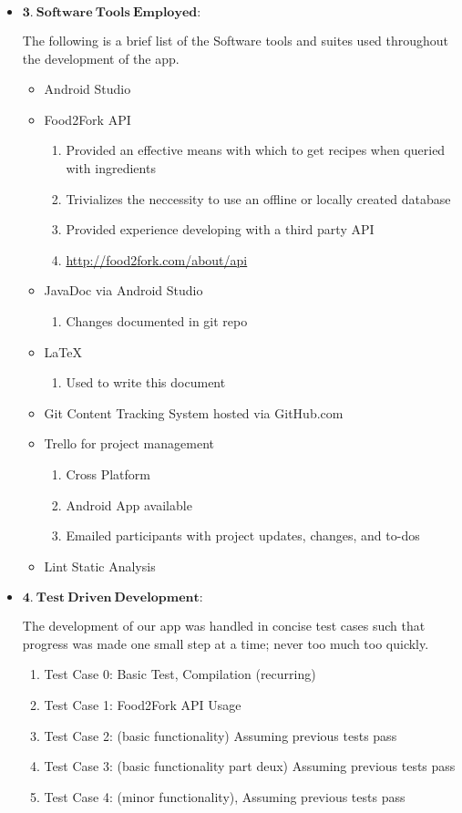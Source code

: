 \documentclass[a4paper,11pt]{article}
\begin{document}
\begin{itemize}
\newpage
\item $\mathbf{3.\ Software\ Tools\ Employed:}$

\parindent 30pt
The following is a brief list of the Software tools and suites used throughout the development of the app.
\begin{itemize}
\item Android Studio
\item Food2Fork API
	\begin{enumerate}
	\item Provided an effective means with which to get recipes when queried with ingredients
	\item Trivializes the neccessity to use an offline or locally created database
	\item Provided experience developing with a third party API
	\item \url{http://food2fork.com/about/api}
	\end{enumerate}
\item JavaDoc via Android Studio
	\begin{enumerate}
	\item Changes documented in git repo
	\end{enumerate}
\item LaTeX
	\begin{enumerate}
	\item Used to write this document
	\end{enumerate}
\item Git Content Tracking System hosted via GitHub.com
\item Trello for project management
	\begin{enumerate}
	\item Cross Platform
	\item Android App available
	\item Emailed participants with project updates, changes, and to-dos
	\end{enumerate}
\item Lint Static Analysis
\end{itemize}

\item $\mathbf{4.\ Test\ Driven\ Development:}$
\parindent 30pt

The development of our app was handled in concise test cases such that progress was made one small step at a time; never too much too quickly. \
\begin{enumerate}
\item Test Case 0: Basic Test, Compilation (recurring)
\item Test Case 1: Food2Fork API Usage
\item Test Case 2: (basic functionality) Assuming previous tests pass
\item Test Case 3: (basic functionality part deux) Assuming previous tests pass
\item Test Case 4: (minor functionality), Assuming previous tests pass
\end{enumerate}


\end{itemize}
\end{document}
